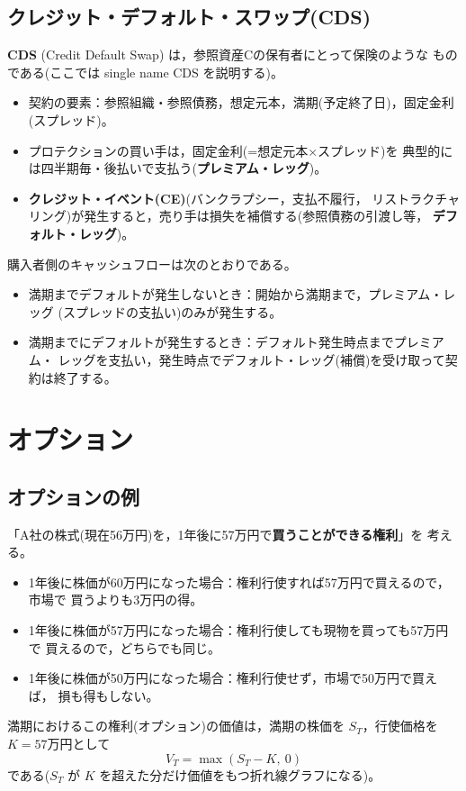 \subsection{クレジット・デフォルト・スワップ(CDS)}

\textbf{CDS} (Credit Default Swap) は，参照資産Cの保有者にとって保険のような
ものである(ここでは single name CDS を説明する)。

\begin{itemize}
\item 契約の要素：参照組織・参照債務，想定元本，満期(予定終了日)，固定金利
(スプレッド)。
\item プロテクションの買い手は，固定金利(=想定元本$\times$スプレッド)を
典型的には四半期毎・後払いで支払う(\textbf{プレミアム・レッグ})。
\item \textbf{クレジット・イベント(CE)}(バンクラプシー，支払不履行，
リストラクチャリング)が発生すると，売り手は損失を補償する(参照債務の引渡し等，
\textbf{デフォルト・レッグ})。
\end{itemize}

購入者側のキャッシュフローは次のとおりである。
\begin{itemize}
\item 満期までデフォルトが発生しないとき：開始から満期まで，プレミアム・レッグ
(スプレッドの支払い)のみが発生する。
\item 満期までにデフォルトが発生するとき：デフォルト発生時点までプレミアム・
レッグを支払い，発生時点でデフォルト・レッグ(補償)を受け取って契約は終了する。
\end{itemize}

\section{オプション}

\subsection{オプションの例}

\begin{example}[例1：買う権利]
「A社の株式(現在56万円)を，1年後に57万円で\textbf{買うことができる権利}」を
考える。
\begin{itemize}
\item 1年後に株価が60万円になった場合：権利行使すれば57万円で買えるので，市場で
買うよりも3万円の得。
\item 1年後に株価が57万円になった場合：権利行使しても現物を買っても57万円で
買えるので，どちらでも同じ。
\item 1年後に株価が50万円になった場合：権利行使せず，市場で50万円で買えば，
損も得もしない。
\end{itemize}
満期におけるこの権利(オプション)の価値は，満期の株価を $S_T$，行使価格を
$K=57$万円として
\[
V_T = \max(S_T - K,\ 0)
\]
である($S_T$ が $K$ を超えた分だけ価値をもつ折れ線グラフになる)。
\end{example}

